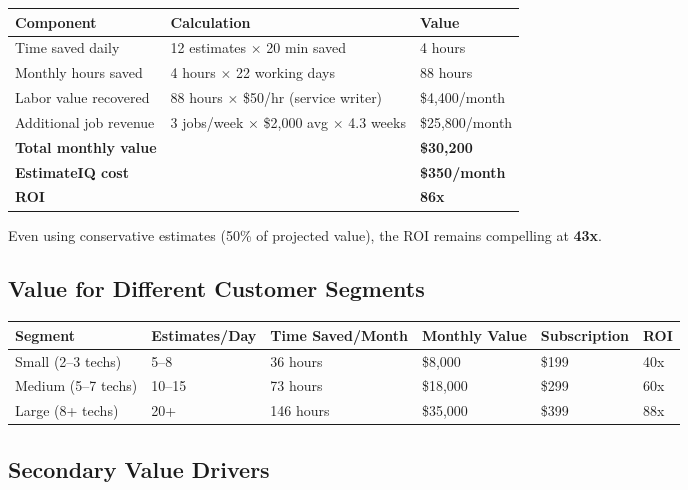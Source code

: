 \documentclass[11pt,a4paper]{article}
\begin{document}
\begin{table}[H]
\centering
\begin{tabularx}{\textwidth}{@{}L{4cm}X R{3cm}@{}}
\toprule
\textbf{Component} & \textbf{Calculation} & \textbf{Value} \\
\midrule
Time saved daily & 12 estimates $\times$ 20 min saved & 4 hours \\
Monthly hours saved & 4 hours $\times$ 22 working days & 88 hours \\
Labor value recovered & 88 hours $\times$ \$50/hr (service writer) & \$4,400/month \\
Additional job revenue & 3 jobs/week $\times$ \$2,000 avg $\times$ 4.3 weeks & \$25,800/month \\
\midrule
\textbf{Total monthly value} & & \textbf{\$30,200} \\
\textbf{EstimateIQ cost} & & \textbf{\$350/month} \\
\textbf{ROI} & & \textbf{86x} \\
\bottomrule
\end{tabularx}
\end{table}

Even using conservative estimates (50\% of projected value), the ROI remains compelling at \textbf{43x}.

\subsection{Value for Different Customer Segments}

\begin{table}[H]
\centering
\small
\begin{tabularx}{\textwidth}{@{}L{3.5cm}C{2.5cm}C{2.5cm}C{2.5cm}C{2cm}C{1.5cm}@{}}
\toprule
\textbf{Segment} & \textbf{Estimates/Day} & \textbf{Time Saved/Month} & \textbf{Monthly Value} & \textbf{Subscription} & \textbf{ROI} \\
\midrule
Small (2--3 techs) & 5--8 & 36 hours & \$8,000 & \$199 & 40x \\
Medium (5--7 techs) & 10--15 & 73 hours & \$18,000 & \$299 & 60x \\
Large (8+ techs) & 20+ & 146 hours & \$35,000 & \$399 & 88x \\
\bottomrule
\end{tabularx}
\end{table}

\subsection{Secondary Value Drivers}
\end{document}
